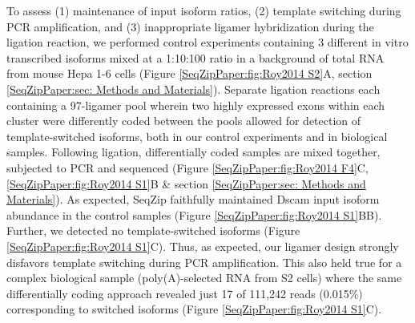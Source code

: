 		To assess (1) maintenance of input isoform ratios, (2) template switching during PCR amplification, and (3) inappropriate ligamer hybridization during the ligation reaction, we performed control experiments containing 3 different in vitro transcribed \dscam{} isoforms mixed at a 1:10:100 ratio in a background of total RNA from mouse Hepa 1-6 cells (Figure \ref{SeqZipPaper:fig:Roy2014 S2}A, section \ref{SeqZipPaper:sec: Methods and Materials}). Separate ligation reactions each containing a 97-ligamer pool wherein two highly expressed exons within each cluster were differently coded between the pools allowed for detection of template-switched isoforms, both in our control experiments and in biological samples. Following ligation, differentially coded samples are mixed together, subjected to PCR and sequenced (Figure \ref{SeqZipPaper:fig:Roy2014 F4}C, \ref{SeqZipPaper:fig:Roy2014 S1}B \& section \ref{SeqZipPaper:sec: Methods and Materials}).  As expected, SeqZip faithfully maintained Dscam input isoform abundance in the control samples (Figure \ref{SeqZipPaper:fig:Roy2014 S1}BB). Further, we detected no template-switched isoforms (Figure \ref{SeqZipPaper:fig:Roy2014 S1}C). Thus, as expected, our ligamer design strongly disfavors template switching during PCR amplification. This also held true for a complex biological sample (poly(A)-selected RNA from S2 cells) where the same differentially coding approach revealed just 17 of 111,242 reads (0.015\%) corresponding to switched isoforms (Figure \ref{SeqZipPaper:fig:Roy2014 S1}C).

